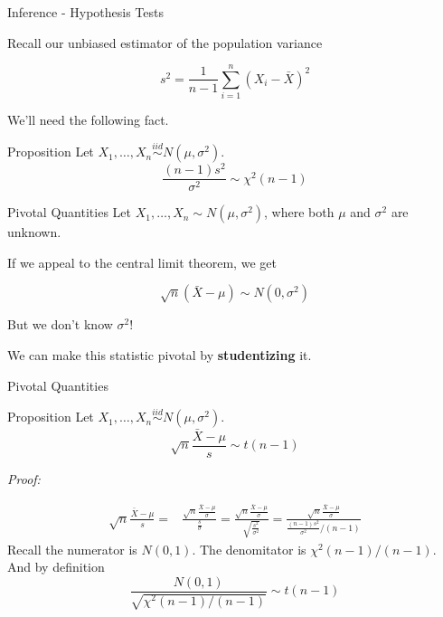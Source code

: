 \documentclass[11pt, xcolor={dvipsnames}, hyperref={colorlinks, allcolors=Blue}]{beamer}
\newcommand\bc[1]{{\usebeamercolor[fg]{frametitle} {\textbf{#1}}}} %
\begin{document}
\begin{frame}{Inference - Hypothesis Tests}

Recall our unbiased estimator of the population variance

\[s^2 = \frac{1}{n-1} \sum_{i=1}^{n} \left ( X_{i} - \bar{X} \right )^2\]

We'll need the following fact.

\begin{block}{Proposition}
Let $X_1, \dots, X_n \overset{iid}{\sim} N(\mu, \sigma^2)$.
\[ \frac{(n-1)s^2}{\sigma^2} \sim \chi^2(n-1)\] 
\end{block}

\end{frame}
\begin{frame}{Pivotal Quantities}
Let $X_{1}, \dots, X_{n} \sim N(\mu, \sigma^{2})$, where both $\mu$ and $\sigma^{2}$ are unknown. \bigskip

If we appeal to the central limit theorem, we get

\[\sqrt{n}(\bar{X} - \mu) \sim N(0, \sigma^{2})\]

But we don't know $\sigma^{2}$!\bigskip

We can make this statistic pivotal by \bc{studentizing} it. 

\end{frame}

\begin{frame}{Pivotal Quantities}
\begin{block}{Proposition}
Let $X_1, \dots, X_n \overset{iid}{\sim} N(\mu, \sigma^2)$.
\[ \sqrt{n} \frac{\bar{X} - \mu}{s} \sim t(n-1)\]
\end{block}
\textit{Proof:}

\begin{align*}
\sqrt{n} \frac {\bar{X} - \mu}{s} =& \frac{\sqrt{n} \frac{\bar{X} - \mu}{\sigma}}{\frac{s}{\sigma}} = \frac{\sqrt{n} \frac{\bar{X} - \mu}{\sigma}}{\sqrt{\frac{s^2}{\sigma^2}}}
= \frac{\sqrt{n} \frac{\bar{X} - \mu}{\sigma}}{\frac{(n-1)s^2}{\sigma^2}/(n-1)}
\end{align*}
Recall the numerator is $N(0,1)$. The denomitator is $\chi^2(n-1)/ (n-1)$. And by definition
\[\frac{N(0,1)}{\sqrt{\chi^2(n-1)/(n-1)}} \sim t(n-1)\]


\end{frame}
\end{document}
